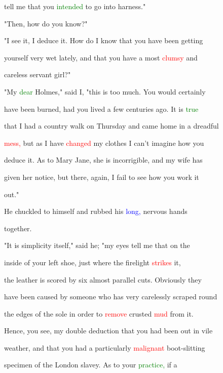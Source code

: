  tell me that you \textcolor{green}{intended} to go into harness."



 "Then, how do you know?"



 "I see it, I deduce it. How do I know that you have been getting

 yourself very wet lately, and that you have a most \textcolor{red}{clumsy} and

 careless \textcolor{BurntOrange}{servant} girl?"



 "My \textcolor{green}{dear} Holmes," said I, "this is too much. You would certainly

 have been burned, had you lived a few centuries ago. It is \textcolor{green}{true}

 that I had a country walk on Thursday and came home in a \textcolor{BurntOrange}{dreadful}

 \textcolor{red}{mess,} but as I have \textcolor{red}{changed} my clothes I can't imagine how you

 deduce it. As to Mary Jane, she is incorrigible, and my wife has

 given her notice, but there, again, I fail to see how you work it

 out."



 He \textcolor{BurntOrange}{chuckled} to himself and rubbed his \textcolor{blue}{long,} \textcolor{BurntOrange}{nervous} hands

 together.



 "It is simplicity itself," said he; "my eyes tell me that on the

 inside of your left shoe, just where the firelight \textcolor{red}{strikes} it,

 the leather is \textcolor{BurntOrange}{scored} by six almost parallel cuts. Obviously they

 have been caused by someone who has very carelessly scraped round

 the edges of the sole in order to \textcolor{red}{remove} crusted \textcolor{red}{mud} from it.

 Hence, you see, my double deduction that you had been out in vile

 weather, and that you had a particularly \textcolor{red}{malignant} boot-slitting

 specimen of the London slavey. As to your \textcolor{green}{practice,} if a

